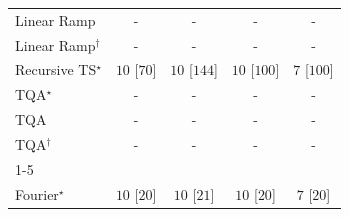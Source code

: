 \begin{tabular}{l|cccc|}
Linear Ramp & {\cellcolor[HTML]{000000}} \color[HTML]{F1F1F1} {\cellcolor{white}} \color{black} - & {\cellcolor[HTML]{000000}} \color[HTML]{F1F1F1} {\cellcolor{white}} \color{black} - & {\cellcolor[HTML]{000000}} \color[HTML]{F1F1F1} {\cellcolor{white}} \color{black} - & {\cellcolor[HTML]{000000}} \color[HTML]{F1F1F1} {\cellcolor{white}} \color{black} - \\
Linear Ramp$^\dagger$ & {\cellcolor[HTML]{000000}} \color[HTML]{F1F1F1} {\cellcolor{white}} \color{black} - & {\cellcolor[HTML]{000000}} \color[HTML]{F1F1F1} {\cellcolor{white}} \color{black} - & {\cellcolor[HTML]{000000}} \color[HTML]{F1F1F1} {\cellcolor{white}} \color{black} - & {\cellcolor[HTML]{000000}} \color[HTML]{F1F1F1} {\cellcolor{white}} \color{black} - \\
Recursive TS$^\star$ & {\cellcolor[HTML]{00441B}} \color[HTML]{F1F1F1} $10$ [$70$] & {\cellcolor[HTML]{00441B}} \color[HTML]{F1F1F1} $10$ [$144$] & {\cellcolor[HTML]{00441B}} \color[HTML]{F1F1F1} $10$ [$100$] & {\cellcolor[HTML]{37A055}} \color[HTML]{F1F1F1} $7$ [$100$] \\
TQA$^\star$ & {\cellcolor[HTML]{000000}} \color[HTML]{F1F1F1} {\cellcolor{white}} \color{black} - & {\cellcolor[HTML]{000000}} \color[HTML]{F1F1F1} {\cellcolor{white}} \color{black} - & {\cellcolor[HTML]{000000}} \color[HTML]{F1F1F1} {\cellcolor{white}} \color{black} - & {\cellcolor[HTML]{000000}} \color[HTML]{F1F1F1} {\cellcolor{white}} \color{black} - \\
TQA & {\cellcolor[HTML]{000000}} \color[HTML]{F1F1F1} {\cellcolor{white}} \color{black} - & {\cellcolor[HTML]{000000}} \color[HTML]{F1F1F1} {\cellcolor{white}} \color{black} - & {\cellcolor[HTML]{000000}} \color[HTML]{F1F1F1} {\cellcolor{white}} \color{black} - & {\cellcolor[HTML]{000000}} \color[HTML]{F1F1F1} {\cellcolor{white}} \color{black} - \\
TQA$^\dagger$ & {\cellcolor[HTML]{000000}} \color[HTML]{F1F1F1} {\cellcolor{white}} \color{black} - & {\cellcolor[HTML]{000000}} \color[HTML]{F1F1F1} {\cellcolor{white}} \color{black} - & {\cellcolor[HTML]{000000}} \color[HTML]{F1F1F1} {\cellcolor{white}} \color{black} - & {\cellcolor[HTML]{000000}} \color[HTML]{F1F1F1} {\cellcolor{white}} \color{black} - \\
\cline{1-5}
\multicolumn{5}{c}{\rule{0pt}{8pt}SV} \\
\midrule
Fourier$^\star$ & {\cellcolor[HTML]{00441B}} \color[HTML]{F1F1F1} $10$ [$20$] & {\cellcolor[HTML]{00441B}} \color[HTML]{F1F1F1} $10$ [$21$] & {\cellcolor[HTML]{00441B}} \color[HTML]{F1F1F1} $10$ [$20$] & {\cellcolor[HTML]{37A055}} \color[HTML]{F1F1F1} $7$ [$20$] \\

\end{tabular}

